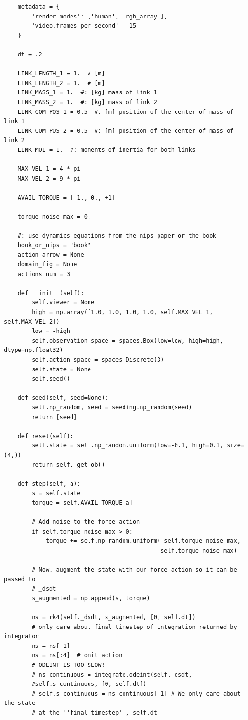 \documentclass[cic,tc]{iiufrgs}
\newenvironment{longlisting}{\captionsetup{type=listing}}{}
\begin{document}
\begin{longlisting}
\begin{verbatim}
    metadata = {
        'render.modes': ['human', 'rgb_array'],
        'video.frames_per_second' : 15
    }

    dt = .2

    LINK_LENGTH_1 = 1.  # [m]
    LINK_LENGTH_2 = 1.  # [m]
    LINK_MASS_1 = 1.  #: [kg] mass of link 1
    LINK_MASS_2 = 1.  #: [kg] mass of link 2
    LINK_COM_POS_1 = 0.5  #: [m] position of the center of mass of link 1
    LINK_COM_POS_2 = 0.5  #: [m] position of the center of mass of link 2
    LINK_MOI = 1.  #: moments of inertia for both links

    MAX_VEL_1 = 4 * pi
    MAX_VEL_2 = 9 * pi

    AVAIL_TORQUE = [-1., 0., +1]

    torque_noise_max = 0.

    #: use dynamics equations from the nips paper or the book
    book_or_nips = "book"
    action_arrow = None
    domain_fig = None
    actions_num = 3

    def __init__(self):
        self.viewer = None
        high = np.array([1.0, 1.0, 1.0, 1.0, self.MAX_VEL_1, self.MAX_VEL_2])
        low = -high
        self.observation_space = spaces.Box(low=low, high=high, dtype=np.float32)
        self.action_space = spaces.Discrete(3)
        self.state = None
        self.seed()

    def seed(self, seed=None):
        self.np_random, seed = seeding.np_random(seed)
        return [seed]

    def reset(self):
        self.state = self.np_random.uniform(low=-0.1, high=0.1, size=(4,))
        return self._get_ob()

    def step(self, a):
        s = self.state
        torque = self.AVAIL_TORQUE[a]

        # Add noise to the force action
        if self.torque_noise_max > 0:
            torque += self.np_random.uniform(-self.torque_noise_max,
                                             self.torque_noise_max)

        # Now, augment the state with our force action so it can be passed to
        # _dsdt
        s_augmented = np.append(s, torque)

        ns = rk4(self._dsdt, s_augmented, [0, self.dt])
        # only care about final timestep of integration returned by integrator
        ns = ns[-1]
        ns = ns[:4]  # omit action
        # ODEINT IS TOO SLOW!
        # ns_continuous = integrate.odeint(self._dsdt,
        #self.s_continuous, [0, self.dt])
        # self.s_continuous = ns_continuous[-1] # We only care about the state
        # at the ''final timestep'', self.dt


\end{verbatim}
\end{longlisting}
\end{document}
